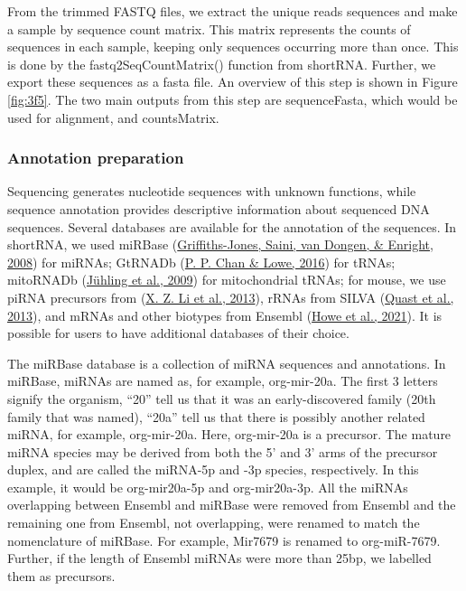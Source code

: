 \documentclass[12pt,twoside]{reedthesis}
\begin{document}
From the trimmed FASTQ files, we extract the unique reads sequences and
make a sample by sequence count matrix. This matrix represents the
counts of sequences in each sample, keeping only sequences occurring
more than once. This is done by the fastq2SeqCountMatrix() function from
shortRNA. Further, we export these sequences as a fasta file. An
overview of this step is shown in Figure \ref{fig:3f5}. The two main outputs from
this step are sequenceFasta, which would be used for alignment, and
countsMatrix.

\hypertarget{annotation-preparation}{%
\subsubsection{Annotation preparation}\label{annotation-preparation}}

Sequencing generates nucleotide sequences with unknown functions, while
sequence annotation provides descriptive information about sequenced DNA
sequences. Several databases are available for the annotation of the
sequences. In shortRNA, we used miRBase (\protect\hyperlink{ref-griffiths-jones2008}{Griffiths-Jones, Saini, van Dongen, \& Enright, 2008}) for
miRNAs; GtRNADb (\protect\hyperlink{ref-chan2016}{P. P. Chan \& Lowe, 2016}) for tRNAs; mitoRNADb (\protect\hyperlink{ref-juxfchling2009}{Jühling et al., 2009}) for
mitochondrial tRNAs; for mouse, we use piRNA precursors from (\protect\hyperlink{ref-li2013}{X. Z. Li et al., 2013}),
rRNAs from SILVA (\protect\hyperlink{ref-quast2013}{Quast et al., 2013}), and mRNAs and other biotypes from Ensembl
(\protect\hyperlink{ref-howe2021}{Howe et al., 2021}). It is possible for users to have additional databases of
their choice.

The miRBase database is a collection of miRNA sequences and annotations.
In miRBase, miRNAs are named as, for example, org-mir-20a. The first 3
letters signify the organism, ``20'' tell us that it was an
early-discovered family (20th family that was named), ``20a'' tell us that
there is possibly another related miRNA, for example, org-mir-20a. Here,
org-mir-20a is a precursor. The mature miRNA species may be derived from
both the 5' and 3' arms of the precursor duplex, and are called the
miRNA-5p and -3p species, respectively. In this example, it would be
org-mir20a-5p and org-mir20a-3p. All the miRNAs overlapping between
Ensembl and miRBase were removed from Ensembl and the remaining one from
Ensembl, not overlapping, were renamed to match the nomenclature of
miRBase. For example, Mir7679 is renamed to org-miR-7679. Further, if
the length of Ensembl miRNAs were more than 25bp, we labelled them as
precursors.
\end{document}
